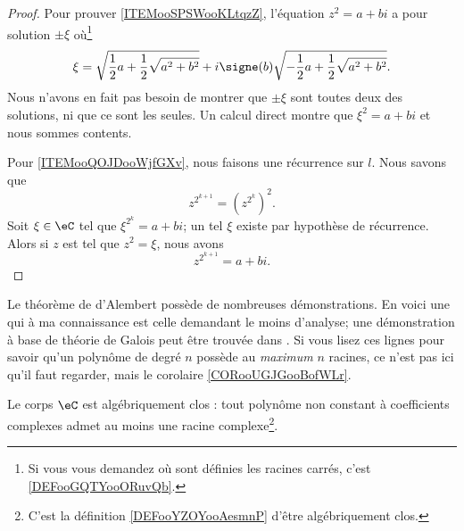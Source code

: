 \begin{proof}
	Pour prouver \ref{ITEMooSPSWooKLtqzZ}, l'équation \( z^2=a+bi\) a pour solution \( \pm\xi\) où\footnote{Si vous vous demandez où sont définies les racines carrés, c'est \ref{DEFooGQTYooORuvQb}.}
	\begin{equation}
		\xi=\sqrt{ \frac{ 1 }{2}a+\frac{ 1 }{2}\sqrt{ a^2+b^2 } }+i\signe(b)\sqrt{ -\frac{ 1 }{2}a+\frac{ 1 }{2}\sqrt{ a^2+b^2 } }.
	\end{equation}
	Nous n'avons en fait pas besoin de montrer que \( \pm\xi\) sont toutes deux des solutions, ni que ce sont les seules. Un calcul direct montre que \( \xi^2=a+bi\) et nous sommes contents.

	Pour \ref{ITEMooQOJDooWjfGXv}, nous faisons une récurrence sur \( l\). Nous savons que
	\begin{equation}
		z^{2^{k+1}}=(z^{2^k})^2.
	\end{equation}
	Soit \( \xi\in \eC\) tel que \( \xi^{2^k}=a+bi\); un tel \( \xi\) existe par hypothèse de récurrence. Alors si \( z\) est tel que \( z^2=\xi\), nous avons
	\begin{equation}
		z^{2^{k+1}}=a+bi.
	\end{equation}
\end{proof}

Le théorème de d'Alembert possède de nombreuses démonstrations. En voici une qui à ma connaissance est celle demandant le moins d'analyse; une démonstration à base de théorie de Galois peut être trouvée dans \cite{rqrNyg,ooPSLMooAVODjn}. Si vous lisez ces lignes pour savoir qu'un polynôme de degré \( n\) possède au \emph{maximum} \( n\) racines, ce n'est pas ici qu'il faut regarder, mais le corolaire \ref{CORooUGJGooBofWLr}.
\begin{theorem}   \label{THOooIRJYooBiHRyW}
	Le corps \( \eC\) est algébriquement clos : tout polynôme non constant à coefficients complexes admet au moins une racine complexe\footnote{C'est la définition \ref{DEFooYZOYooAesmnP} d'être algébriquement clos.}.
\end{theorem}

